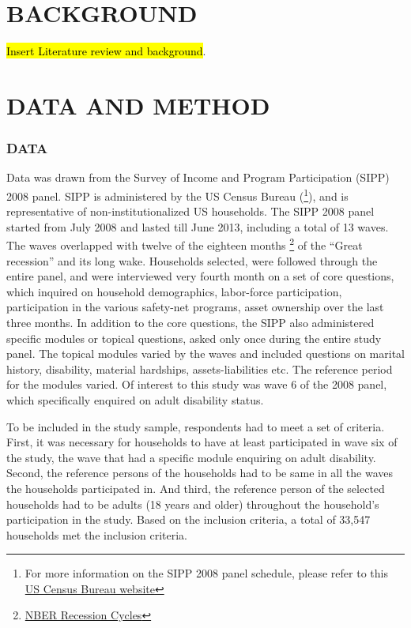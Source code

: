 \documentclass[11pt]{extarticle} %
\begin{document}
\section*{BACKGROUND}
\noindent
{\hl{Insert Literature review and background}}.

\section*{DATA AND METHOD}
\subsubsection*{DATA}
Data was drawn from the Survey of Income and Program Participation (SIPP) 2008 panel. SIPP is administered by the US Census Bureau ({\footnote{For more information on the SIPP 2008 panel schedule, please refer to this \href{http://www.census.gov/programs-surveys/sipp/data/2008-panel.html}{US Census Bureau website}}}), and is representative of non-institutionalized US households. The SIPP 2008 panel started from July 2008 and lasted till June 2013, including a total of 13 waves. The waves overlapped with twelve of the eighteen months {\footnote{\href{http://www.nber.org/cycles/}{NBER Recession Cycles}}} of the “Great recession” and its long wake. Households selected, were followed through the entire panel, and were interviewed very fourth month on a set of core questions, which inquired on household demographics, labor-force participation, participation in the various safety-net programs, asset ownership over the last three months. In addition to the core questions, the SIPP also administered specific modules or topical questions, asked only once during the entire study panel. The topical modules varied by the waves and included questions on marital history, disability, material hardships, assets-liabilities etc. The reference period for the modules varied. Of interest to this study was wave 6 of the 2008 panel, which specifically enquired on adult disability status.

To be included in the study sample, respondents had to meet a set of criteria. First, it was necessary for households to have at least participated in wave six of the study, the wave that had a specific module enquiring on adult disability. Second, the reference persons of the households had to be same in all the waves the households participated in. And third, the reference person of the selected households had to be adults (18 years and older) throughout the household's participation in the study. Based on the inclusion criteria, a total of 33,547 households met the inclusion criteria.
\end{document}
